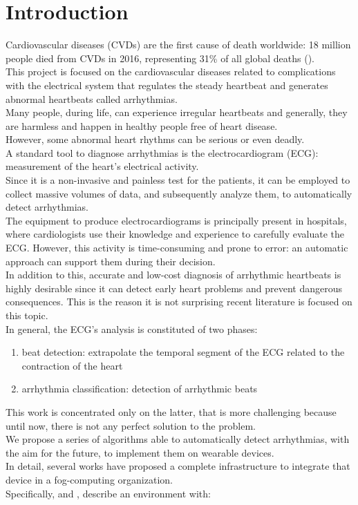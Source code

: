 \documentclass[LaM,binding=0.6cm]{sapthesis}
\begin{document}
\chapter{Introduction}
Cardiovascular diseases (CVDs) are the first cause of death worldwide: 18 million people died from CVDs in 2016, representing 31\% of all global deaths (\cite{who}).\\This project is focused on the cardiovascular diseases related to complications with the electrical system that regulates the steady heartbeat and generates abnormal heartbeats called arrhythmias.\\ Many people, during life, can experience irregular heartbeats and generally,  they are harmless and happen in healthy people free of heart disease.\\However, some abnormal heart rhythms can be serious or even deadly.\\ A standard tool to diagnose arrhythmias is the electrocardiogram (ECG): measurement of the heart's electrical activity.\\Since it is a non-invasive and painless test for the patients, it can be employed to collect massive volumes of data, and subsequently analyze them, to automatically detect arrhythmias.\\The equipment to produce electrocardiograms is principally present in hospitals, where cardiologists use their knowledge and experience to carefully evaluate the ECG. However, this activity is time-consuming and prone to error: an automatic approach can support them during their decision.\\In addition to this, accurate and low-cost diagnosis of arrhythmic heartbeats is highly desirable since it can detect early heart problems and prevent dangerous consequences. This is the reason it is not surprising recent literature is focused on this topic.\\In general, the ECG's analysis is constituted of two phases:
\begin{enumerate}
\item beat detection: extrapolate the temporal segment of the ECG related to the contraction of the heart
\item arrhythmia  classification: detection of arrhythmic beats
\end{enumerate} 
This work is concentrated only on the latter, that is more challenging because until now, there is not any perfect solution to the problem.\\We propose a series of algorithms able to automatically detect arrhythmias, with the aim for the future, to implement them on wearable devices.\\In detail, several works have proposed a complete infrastructure to integrate that device in a fog-computing organization.\\Specifically, \cite{fog} and \cite{citf}, describe an environment with:
\end{document}
